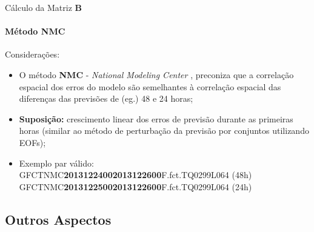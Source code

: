 \documentclass[10pt,aspectratio=169]{beamer}
\begin{document}
\begin{frame}[fragile]{Cálculo da Matriz $\mathbf{B}$}
\framesubtitle{Método NMC}
  \begin{block}{Considerações:}
  \vspace{0.5em}
    \begin{itemize}
      \item O método \textbf{NMC} - \textit{National Modeling Center} \cite{parrishetal/1992}, preconiza que a correlação espacial dos erros do modelo são semelhantes à correlação espacial das diferenças das previsões de (eg.) 48 e 24 horas;
      \pause
      \item \textbf{Suposição:} crescimento linear dos erros de previsão durante as primeiras horas (similar ao método de perturbação da previsão por conjuntos utilizando EOFs);
      \pause
      \item Exemplo par válido: \\
      GFCTNMC\textcolor{laranjainpe}{\textbf{2013122400}}\textcolor{azulinpe}{\textbf{2013122600}}F.fct.TQ0299L064 (48h) \\
      GFCTNMC\textcolor{laranjainpe}{\textbf{2013122500}}\textcolor{azulinpe}{\textbf{2013122600}}F.fct.TQ0299L064 (24h)
    \end{itemize}
  \end{block}
\end{frame}

\subsection{Outros Aspectos}
\end{document}
